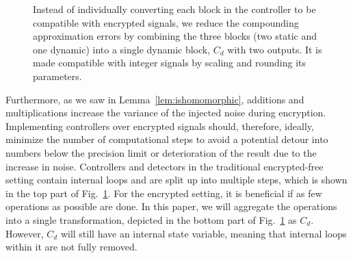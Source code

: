 \documentclass[journal, twoside, web]{ieeecolorpreprint}
\begin{document}
\begin{figure}
    \caption{Instead of individually converting each block in the controller to be compatible with encrypted signals, we reduce the compounding approximation errors by combining the three blocks (two static and one dynamic) into a single dynamic block, $C_d$ with two outputs. It is made compatible with integer signals by scaling and rounding its parameters.%
    }    \label{fig:controller_enc_fig}
\end{figure}
Furthermore, as we saw in Lemma~\ref{lem:ishomomorphic}, additions and multiplications increase the variance of the injected noise during encryption. Implementing controllers over encrypted signals should, therefore, ideally, minimize the number of computational steps to avoid a potential detour into numbers below the precision limit or deterioration of the result due to the increase in noise. Controllers and detectors in the traditional encrypted-free setting contain internal loops and are split up into multiple steps, which is shown in the top part of Fig.~\ref{fig:controller_enc_fig}. For the encrypted setting, it is beneficial if as few operations as possible are done. In this paper, we will aggregate the operations into a single transformation, depicted in the bottom part of Fig.~\ref{fig:controller_enc_fig} as $C_d$. However, $C_d$ will still have an internal state variable, meaning that internal loops within it are not fully removed.
\end{document}
